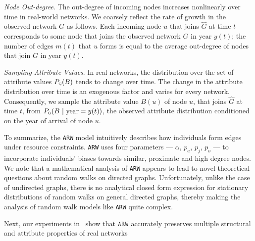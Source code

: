 \textit{Node Out-degree}.
The out-degree of incoming nodes increases  nonlinearly over time in real-world networks.
We coarsely reflect the rate of growth in the observed network $G$ as follows.
Each incoming node $u$ that joins $\hat{G}$ at time $t$ corresponds to some
node that joins the observed network $G$ in year $y(t)$; the number of edges $m(t)$
that $u$ forms is equal to the average out-degree of nodes that join $G$ in year $y(t)$.

\textit{Sampling Attribute Values}.
In real networks, the distribution over the set of attribute values $P_{\textsc{g}}(B)$ tends to change over time.
The change in the attribute distribution over time is an exogenous factor and varies for every network.
Consequently, we sample the attribute value $B(u)$ of node $u$, that joins $\hat{G}$ at time
$t$, from $P_{\textsc{g}}(B{\mbox{ | year}=y(t)})$, the observed attribute
distribution conditioned on the year of arrival of node $u$.

To summarize, the \texttt{ARW} model
intuitively describes how individuals form edges under resource constraints.
\texttt{ARW} uses four parameters --- $\alpha$, $p_a$, $p_j$, $p_o$ --- to incorporate
individuals' biases towards similar, proximate and high degree nodes.
We note that a mathematical analysis of \texttt{ARW} appears to lead to novel
theoretical questions about random walks on directed graphs.
Unfortunately, unlike the case of undirected graphs, there is no
analytical closed form expression for stationary distributions of random walks
on general directed graphs, thereby making the analysis of random walk models
like \texttt{ARW} quite complex.

Next, our experiments in~ show that $\texttt{ARW}$ accurately preserves
{multiple} structural and attribute properties of real networks

